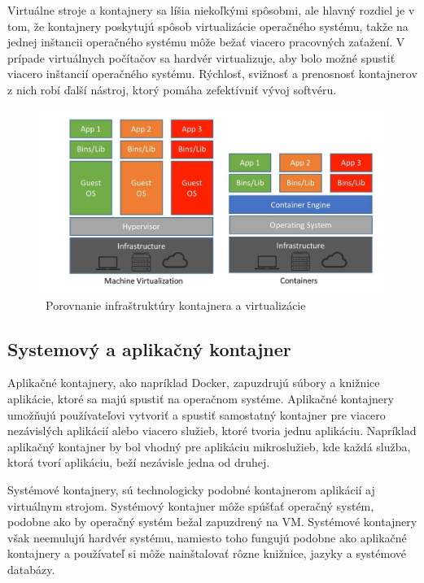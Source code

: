 Virtuálne stroje a kontajnery sa líšia niekoľkými spôsobmi, ale hlavný rozdiel je v tom, že kontajnery poskytujú spôsob virtualizácie operačného systému, takže na jednej inštancii operačného systému môže bežať viacero pracovných zaťažení. V prípade virtuálnych počítačov sa hardvér virtualizuje, aby bolo možné spustiť viacero inštancií operačného systému. Rýchlosť, svižnosť a prenosnosť kontajnerov z nich robí ďalší nástroj, ktorý pomáha zefektívniť vývoj softvéru.

\begin{figure}[!ht]
    \includegraphics[width=.9\textwidth]{figures/containervsvirtual}
    \caption{\ Porovnanie infraštruktúry kontajnera a virtualizácie \cite{containervsvirtual} \label{o:latex_friendly_zone}}
\end{figure}

\subsection{Systemový a aplikačný kontajner}

Aplikačné kontajnery, ako napríklad Docker, zapuzdrujú súbory a knižnice aplikácie, ktoré sa majú spustiť na operačnom systéme. Aplikačné kontajnery umožňujú používateľovi vytvoriť a spustiť samostatný kontajner pre viacero nezávislých aplikácií alebo viacero služieb, ktoré tvoria jednu aplikáciu. Napríklad aplikačný kontajner by bol vhodný pre aplikáciu mikroslužieb, kde každá služba, ktorá tvorí aplikáciu, beží nezávisle jedna od druhej.

Systémové kontajnery, sú technologicky podobné kontajnerom aplikácií aj virtuálnym strojom. Systémový kontajner môže spúšťať operačný systém, podobne ako by operačný systém bežal zapuzdrený na VM. Systémové kontajnery však neemulujú hardvér systému, namiesto toho fungujú podobne ako aplikačné kontajnery a používateľ si môže nainštalovať rôzne knižnice, jazyky a systémové databázy. \cite{systemvsapli}

